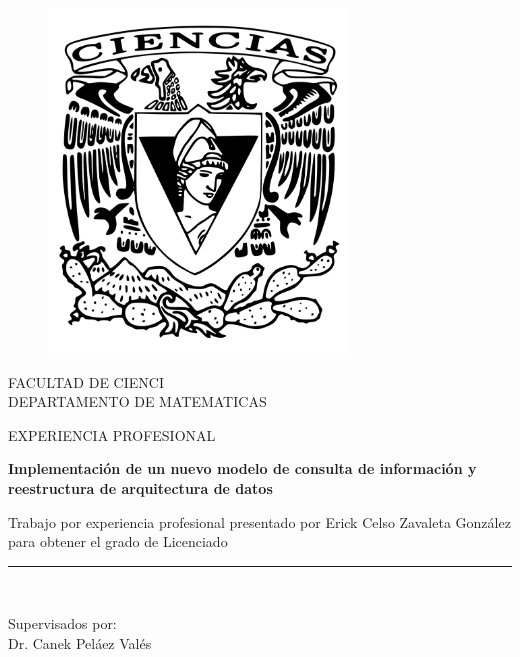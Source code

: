 \documentclass[a4paper,openright,12pt]{book}
\begin{document}
\begin{titlepage}

\begin{center}
\vspace*{-1in}
\begin{figure}[htb]
\begin{center}
\includegraphics[width=8cm]{ciencias2}
\end{center}
\end{figure}

FACULTAD DE CIENCI\\
\vspace*{0.15in}
DEPARTAMENTO DE MATEMATICAS\\
\vspace*{0.6in}
\begin{large}
EXPERIENCIA PROFESIONAL\\
\end{large}
\vspace*{0.2in}
\begin{Large}
\textbf{Implementación de un nuevo modelo de consulta de información y reestructura de arquitectura de datos} \\
\end{Large}
\vspace*{0.3in}
\begin{large}
Trabajo por experiencia profesional presentado por Erick Celso Zavaleta González para obtener el grado de Licenciado \\
\end{large}
\vspace*{0.3in}
\rule{80mm}{0.1mm}\\
\vspace*{0.1in}
\begin{large}
Supervisados por: \\
Dr. Canek Peláez Valés \\
\end{large}
\end{center}

\end{titlepage}
\end{document}
